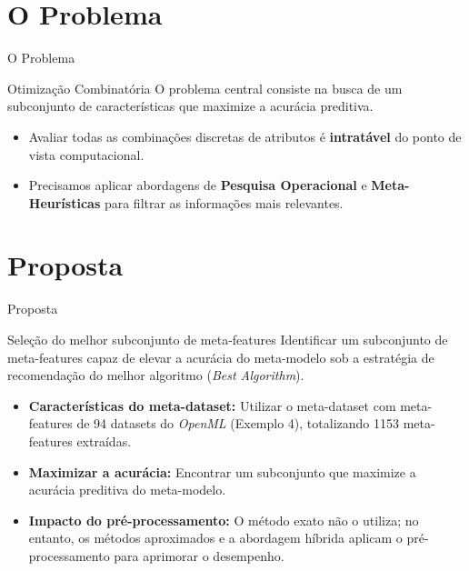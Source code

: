 \documentclass [aspectratio=169]{beamer}
\begin{document}
\section{O Problema}

\begin{frame}{O Problema}
\begin{block}{Otimização Combinatória}
O problema central consiste na busca de um subconjunto de características que maximize a acurácia preditiva.
\end{block}

\vspace{0.3cm}
\begin{itemize}
    \item Avaliar todas as combinações discretas de atributos é \textbf{intratável} do ponto de vista computacional.
    \item Precisamos aplicar abordagens de \textbf{Pesquisa Operacional} e \textbf{Meta-Heurísticas} para filtrar as informações mais relevantes.
\end{itemize}
\end{frame}

\section{Proposta}

\begin{frame}{Proposta}

\begin{block}{Seleção do melhor subconjunto de meta-features}
Identificar um subconjunto de meta-features capaz de elevar a acurácia do meta-modelo sob a estratégia de recomendação do melhor algoritmo (\textit{Best Algorithm}).\end{block}

\begin{itemize}
    \item \textbf{Características do meta-dataset:} Utilizar o meta-dataset com meta-features de 94 datasets do \textit{OpenML} (Exemplo 4), totalizando 1153 meta-features extraídas.
    \item \textbf{Maximizar a acurácia:} Encontrar um subconjunto que maximize a acurácia preditiva do meta-modelo.
    \item \textbf{Impacto do pré-processamento:} O método exato não o utiliza; no entanto, os métodos aproximados e a abordagem híbrida aplicam o pré-processamento para aprimorar o desempenho.
\end{itemize}
\end{frame}
\end{document}
